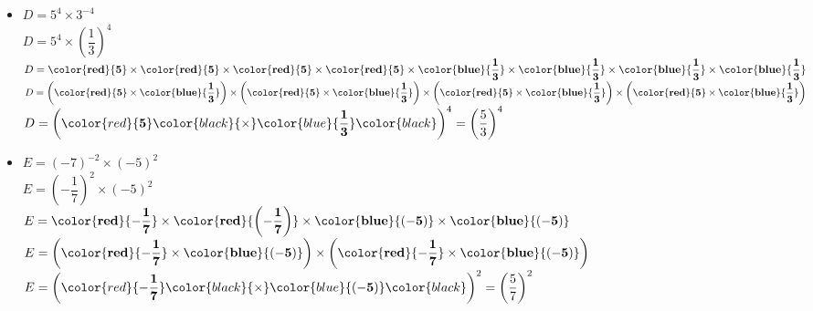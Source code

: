 \begin{corrige}
\begin{itemize}
        \bigskip
        \item $D=5^4\times 3^{-4}$\\
        $D=5^4\times \left(\dfrac{1}{3}\right)^4$\\
        $D=\mathbf{\color{red}{5}} \times \mathbf{\color{red}{5}}\times \mathbf{\color{red}{5}} \times \mathbf{\color{red}{5}} \times \mathbf{\color{blue}{\dfrac{1}{3}}}\times \mathbf{\color{blue}{\dfrac{1}{3}}}\times \mathbf{\color{blue}{\dfrac{1}{3}}}\times \mathbf{\color{blue}{\dfrac{1}{3}}}$\\
        $D=\left(\mathbf{\color{red}{5}} \times \mathbf{\color{blue}{\dfrac{1}{3}}}\right)\times \left(\mathbf{\color{red}{5}} \times \mathbf{\color{blue}{\dfrac{1}{3}}}\right)\times \left(\mathbf{\color{red}{5}} \times \mathbf{\color{blue}{\dfrac{1}{3}}}\right)\times \left(\mathbf{\color{red}{5}} \times \mathbf{\color{blue}{\dfrac{1}{3}}}\right)$\\
        $D= \left(\color{red}{\mathbf{5}} \color{black}{\times} \color{blue}{\mathbf{\dfrac{1}{3}}}\color{black}\right)^{4}=\left(\dfrac{5}{3}\right)^4$

        \bigskip
        \item $E=(-7)^{-2}\times (-5)^2$\\
        $E=\left(-\dfrac{1}{7}\right)^2\times (-5)^2$\\
        $E=\mathbf{\color{red}{-\dfrac{1}{7}}}\times \mathbf{\color{red}{\left(-\dfrac{1}{7}\right)}}\times \mathbf{\color{blue}{(-5)}}\times \mathbf{\color{blue}{(-5)}}$\\
        $E=\left(\mathbf{\color{red}{-\dfrac{1}{7}}} \times \mathbf{\color{blue}{(-5)}}\right) \times \left(\mathbf{\color{red}{-\dfrac{1}{7}}} \times \mathbf{\color{blue}{(-5)}}\right)$\\
        $E=\left(\color{red}{\mathbf{-\dfrac{1}{7}}} \color{black}{\times} \color{blue}{\mathbf{(-5)}}\color{black}\right)^2=\left(\dfrac{5}{7}\right)^2$


\end{itemize}
\end{corrige}
